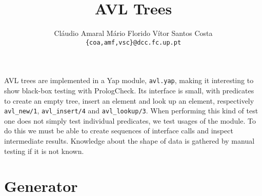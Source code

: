 \documentclass[11pt]{article}
\makeatletter
\newcommand{\yap}[1]{\lstinline[style=yap]{#1}}
\newcommand{\Yap}[0]{{\sf Yap}}
\newcommand{\plqc}[0]{{\sf PrologCheck}}
\def\cleardoublepage{\clearpage\if@twoside \ifodd\c@page\else%
\hbox{}%
\thispagestyle{empty}
\newpage%
\if@twocolumn\hbox{}\newpage\fi\fi\fi}
\makeatother
\begin{document}



\mkcoverpage

\title{AVL Trees}
\author{Cláudio Amaral\hspace{0.5cm} Mário Florido \hspace{0.5cm}
Vítor Santos Costa\\ {\tt \{coa,amf,vsc\}@dcc.fc.up.pt}}

\date{}
\cleardoublepage

\maketitle



AVL trees are implemented in a \Yap{} module,  \yap{avl.yap}, making it interesting to
show black-box testing with \plqc{}.
%
Its interface is small, with predicates%
to create an empty
tree, insert an element and look up an element, respectively
\yap{avl_new/1}, \yap{avl_insert/4} and \yap{avl_lookup/3}.
%
%
When performing this kind of test one does not simply test individual
predicates, we test usages of the module.
%
To do this we must be able to create sequences of interface
calls and inspect intermediate results.
%
Knowledge about the shape of data is gathered by manual testing if it is
not known.

\section*{Generator}
\end{document}
